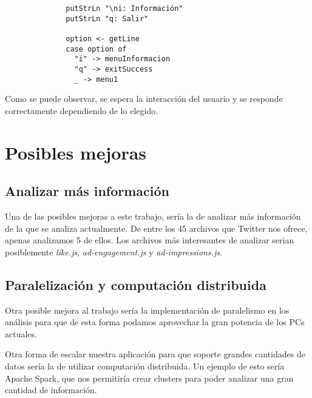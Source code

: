 \documentclass[11pt]{article}
\begin{document}
\begin{itemize}
\begin{itemize}
\begin{verbatim}
              putStrLn "\ni: Información"
              putStrLn "q: Salir"
            
              option <- getLine
              case option of
                "i" -> menuInformacion
                "q" -> exitSuccess
                _ -> menu1
        \end{verbatim}
        
        Como se puede observar, se espera la interacción del usuario y se responde correctamente dependiendo de lo elegido.
        
        
        
    \end{itemize}
    
\end{itemize}

\section{Posibles mejoras}
\subsection{Analizar más información}

Una de las posibles mejoras a este trabajo, sería la de analizar más información de la que se analiza actualmente. De entre los 45 archivos que Twitter nos ofrece, apenas analizamos 5 de ellos.
Los archivos más interesantes de analizar serian posiblemente \textit{like.js}, \textit{ad-engagement.js} y \textit{ad-impressions.js}.

\subsection{Paralelización y computación distribuida}
Otra posible mejora al trabajo sería la implementación de paralelismo en los análisis para que de esta forma podamos aprovechar la gran potencia de los PCs actuales. 

Otra forma de escalar nuestra aplicación para que soporte grandes cantidades de datos sería la de utilizar computación distribuida. Un ejemplo de esto sería Apache Spark\cite{spark}, que nos permitiría crear clusters para poder analizar una gran cantidad de información.
\end{document}

